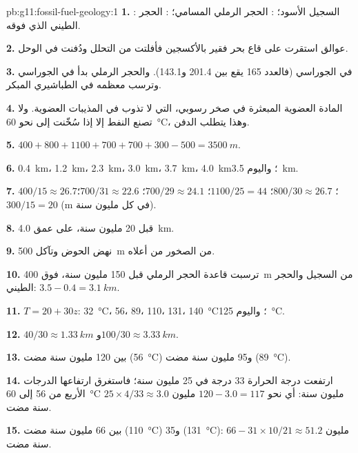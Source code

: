 \begin{solution}{pb:g11:fossil-fuel-geology:1}
\textbf{1.} : السجيل الأسود؛ : الحجر الرملي المسامي؛
: الحجر الطيني الذي فوقه.

\textbf{2.} عوالق استقرت على قاع بحر فقير بالأكسجين فأفلتت من
التحلل ودُفنت في الوحل.

\textbf{3.}  في الجوراسي (فالعدد 165 يقع بين 201.4
و143.1). والحجر الرملي بدأ في الجوراسي وترسب معظمه في
الطباشيري المبكر.

\textbf{4.} المادة العضوية المبعثرة في صخر رسوبي، التي لا تذوب في
المذيبات العضوية. ولا تصنع النفط إلا إذا سُخّنت إلى نحو
\qty{60}{\degreeCelsius}، وهذا يتطلب الدفن.

\textbf{5.} $400 + 800 + 1100 + 700 + 700 + 300 - 500 = \qty{3500}{m}$.

\textbf{6.} \qty{0.4}{km}، \qty{1.2}{km}، \qty{2.3}{km}، \qty{3.0}{km}،
\qty{3.7}{km}، \qty{4.0}{km}؛ واليوم \qty{3.5}{km}.

\textbf{7.} $400/15 \approx 26.7$؛ $800/30 \approx 26.7$؛ $1100/25 = 44$؛
$700/29 \approx 24.1$؛ $700/31 \approx 22.6$؛ $300/15 = 20$ (\unit{m} في كل
مليون سنة).

\textbf{8.} قبل 20 مليون سنة، على عمق \qty{4.0}{km}.

\textbf{9.} نهض الحوض وتآكل \qty{500}{m} من الصخور من
أعلاه.

\textbf{10.} ترسبت قاعدة الحجر الرملي قبل 150 مليون سنة، فوق
\qty{400}{m} من السجيل والحجر الطيني: $3.5 - 0.4 = \qty{3.1}{km}$.

\textbf{11.} $T = 20 + 30 z$: \qty{32}{\degreeCelsius}، \num{56}، \num{89}،
\num{110}، \num{131}، \qty{140}{\degreeCelsius}؛ واليوم
\qty{125}{\degreeCelsius}.

\textbf{12.} $40/30 \approx \qty{1.33}{km}$ و$100/30 \approx
\qty{3.33}{km}$.

\textbf{13.} بين 120 مليون سنة مضت (\qty{56}{\degreeCelsius})
و95 مليون سنة مضت (\qty{89}{\degreeCelsius}).

\textbf{14.} ارتفعت درجة الحرارة 33 درجة في 25 مليون سنة؛ فاستغرق
ارتفاعها الدرجات الأربع من \num{56} إلى \qty{60}{\degreeCelsius}
$25 \times 4/33 \approx 3.0$ مليون سنة: أي نحو $120 - 3.0 = 117$ مليون سنة
مضت.

\textbf{15.} بين 66 مليون سنة مضت (\qty{110}{\degreeCelsius})
و35 (\qty{131}{\degreeCelsius}): $66 - 31 \times 10/21 \approx 51.2$ مليون
سنة مضت.


\end{solution}
